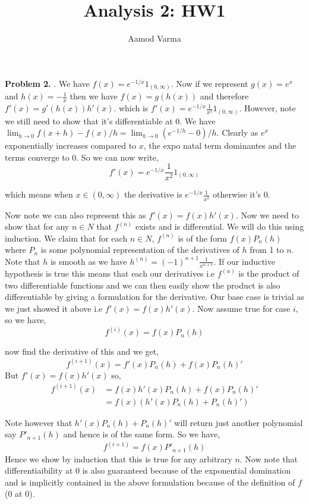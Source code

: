 \documentclass[a4paper]{article}
\title{Analysis 2: HW1}
\author{Aamod Varma}
\begin{document}
\maketitle
\textbf{Problem 2.}
. We have $f(x) = e^{-1 / x} 1_{(0, \infty)}$. Now if we represent $g(x) = e^{x}$ and $h(x) = -\frac{1}{x}$ then we have $f(x) = g(h(x))$ and therefore $f'(x)= g'(h(x)) h'(x)$. which is $f'(x) = e^{-1 / x} \frac{1}{x^2} 1_{(0, \infty)}$. However, note we still need to show that it's differentiable at $0$. We have $\lim_{h \to 0} f(x + h) - f(x) / h =\lim_{h \to 0}  (e^{-1 / h} - 0) / h$. Clearly as $e^{x}$  exponentially increases compared to $x$, the expo natal term dominantes and the terms converge to $0$. So we can now write, 
\[
    f'(x) = e^{-1 / x} \frac{1}{x^2} 1_(0, \infty)
\]

which means when $x \in (0, \infty)$ the derivative is $e^{-1 / x} \frac{1}{x^2}$ otherwise it's $0$.

Now note we can also represent this as $f'(x) = f(x) h'(x)$. Now we need to show that for any $n \in N$ that $f^{(n)}$ exists and is differential. We will do this using induction. We claim that for each $n \in N$, $f^{(n)}$ is of the form $f(x) P_n(h)$ where $P_n$ is some polynomial representation  of the derivatives of $h$ from 1 to $n$. Note that $h$ is smooth as we have $h^{(n)} = (-1)^{n + 1} \frac{1}{x^{n + 1}}$. If our inductive hypothesis is true this means that each our derivatives i.e $f^{(n)}$ is the product of two differentiable functions and we can then easily show the product is also differentiable by giving a formulation for the derivative. Our base case is trivial as we just showed it above i.e $f'(x) = f(x) h'(x)$. Now assume true for case $i$, so we have, 
\[
    f^{(i)}(x) = f(x) P_n(h)
\]

now find the derivative of this and we get, 
\[
    f^{(i + 1)}(x) = f'(x) P_n(h) + f(x) P_n(h)'
\]
But $f'(x) = f(x) h'(x)$ so, 
\begin{align*}
    f^{(i + 1)}(x) &= f(x) h'(x) P_n(h) + f(x) P_n(h)'\\
                   &= f(x) (h'(x) P_n(h) + P_n(h)')
\end{align*}

Note however that $h'(x) P_n(h) + P_n(h)'$  will return just another polynomial say $P'_{n + 1}(h)$ and hence is of the same form. So we have, 
\[
    f^{(i + 1)} = f(x) P'_{n + 1}(h)
\]
Hence we show by induction that this is true for any arbitrary $n$. Now note that differentiaibility at $0$  is also guaranteed because of the exponential domination and is implicitly contained in the above formulation because of the definition of $f$ (0 at 0).
\end{document}
